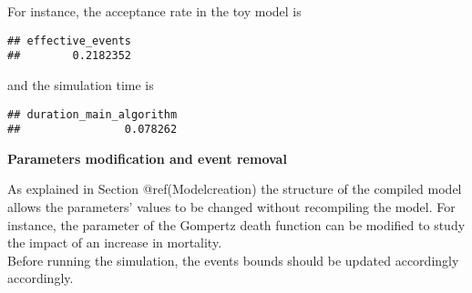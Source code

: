 For instance, the acceptance rate in the toy model is

\begin{Shaded}
\begin{Highlighting}[]
\OperatorTok{$}\NormalTok{logs[}\NormalTok{]}\OperatorTok{/}\OperatorTok{$}\NormalTok{logs[}\NormalTok{]}
\end{Highlighting}
\end{Shaded}

\begin{verbatim}
## effective_events 
##        0.2182352
\end{verbatim}

and the simulation time is

\begin{Shaded}
\begin{Highlighting}[]
\OperatorTok{$}\NormalTok{logs[}\NormalTok{]}
\end{Highlighting}
\end{Shaded}

\begin{verbatim}
## duration_main_algorithm 
##                0.078262
\end{verbatim}

\textbf{Parameters modification and event removal}

As explained in Section @ref(Modelcreation) the structure of the compiled model allows the parameters' values to be changed without recompiling the model. For instance, the parameter of the Gompertz death function can be modified to study the impact of an increase in mortality.\\
Before running the simulation, the events bounds should be updated accordingly accordingly.

\begin{Shaded}
\begin{Highlighting}[]
\OperatorTok{$}\StringTok{ }\NormalTok{(}\NormalTok{,}\NormalTok{)}

\NormalTok{events\_bounds[}\NormalTok{] \textless{}{-}}\StringTok{ }\OperatorTok{*}\NormalTok{(}\OperatorTok{*}

\StringTok{ }
                   \NormalTok{) }
\end{Highlighting}
\end{Shaded}

